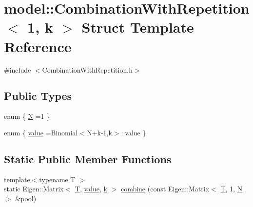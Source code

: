 \hypertarget{structmodel_1_1_combination_with_repetition_3_011_00_01k_01_4}{}\section{model\+:\+:Combination\+With\+Repetition$<$ 1, k $>$ Struct Template Reference}
\label{structmodel_1_1_combination_with_repetition_3_011_00_01k_01_4}


{\ttfamily \#include $<$Combination\+With\+Repetition.\+h$>$}

\subsection*{Public Types}
\begin{DoxyCompactItemize}
\item 
enum \{ \hyperlink{structmodel_1_1_combination_with_repetition_3_011_00_01k_01_4_a1e523a554e6ec5beb4e53259964deeb7a1e2b2b3e3c91c5164961fe1da63592e6}{N} =1
 \}
\item 
enum \{ \hyperlink{structmodel_1_1_combination_with_repetition_3_011_00_01k_01_4_a9c013e1aef5459b5a563266d31b3e259a913168cfa353eacd46528c5d7ca7bf4b}{value} =Binomial$<$N+k-\/1,k$>$\+:\+:value
 \}
\end{DoxyCompactItemize}
\subsection*{Static Public Member Functions}
\begin{DoxyCompactItemize}
\item 
{\footnotesize template$<$typename T $>$ }\\static Eigen\+::\+Matrix$<$ \hyperlink{_spline_node_base__corder1_8h_a82692d3a5502b91460591f1d5504314a}{T}, \hyperlink{structmodel_1_1_combination_with_repetition_3_011_00_01k_01_4_a9c013e1aef5459b5a563266d31b3e259a913168cfa353eacd46528c5d7ca7bf4b}{value}, \hyperlink{_f_e_m_2linear__elasticity__3d_2tetgen_2generate_p_o_l_ycube_8m_a5d2aad4440da75aa43f2643e72b1a3bd}{k} $>$ \hyperlink{structmodel_1_1_combination_with_repetition_3_011_00_01k_01_4_acf027bd1e8d18b37b30c105ff5f765f9}{combine} (const Eigen\+::\+Matrix$<$ \hyperlink{_spline_node_base__corder1_8h_a82692d3a5502b91460591f1d5504314a}{T}, 1, \hyperlink{structmodel_1_1_combination_with_repetition_3_011_00_01k_01_4_a1e523a554e6ec5beb4e53259964deeb7a1e2b2b3e3c91c5164961fe1da63592e6}{N} $>$ \&pool)
\end{DoxyCompactItemize}


